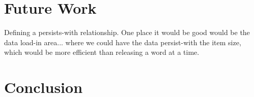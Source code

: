 \section{Future Work}



Defining a persists-with relationship.
One place it would be good would be the data load-in area... where we could have
the data persist-with the item size, which would be more efficient than
releasing a word at a time.


\section{Conclusion}

